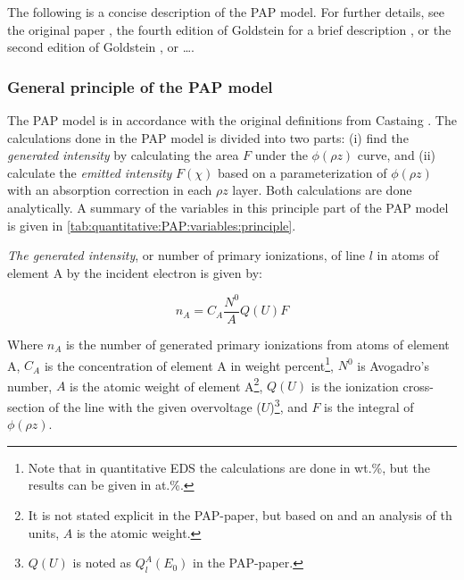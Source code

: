 The following is a concise description of the PAP model. 
For further details, see the original paper \cite{pap_1991}, the fourth edition of Goldstein for a brief description \cite{goldstein_scanning_2018}, or the second edition of Goldstein \cite{goldstein_2ed_1992}, or \dots {}.








\subsubsection{General principle of the PAP model}
\label{theory:quantitative:pap:general_principle}

The PAP model is in accordance with the original definitions from Castaing \cite{castaing_1951}.
The calculations done in the PAP model is divided into two parts: (i) find the \emph{generated intensity} by calculating the area $F$ under the $\phi(\rho z)$ curve, and (ii) calculate the \emph{emitted intensity} $F(\chi)$ based on a parameterization of $\phi(\rho z)$ with an absorption correction in each $\rho z$ layer.
Both calculations are done analytically.
A summary of the variables in this principle part of the PAP model is given in \cref{tab:quantitative:PAP:variables:principle}.


\emph{The generated intensity}, or number of primary ionizations, of line $l$ in atoms of element A by the incident electron is given by:

\begin{equation}
    \label{eq:theory:quantitative:pap:general_principle:n_a}
    n_A = C_A \frac{N^0}{A} Q(U) F
\end{equation}

Where $n_A$ is the number of generated primary ionizations from atoms of element A, $C_A$ is the concentration of element A in weight percent\footnote{Note that in quantitative EDS the calculations are done in wt.\%, but the results can be given in at.\%.}, $N^0$ is Avogadro's number, $A$ is the atomic weight of element A\footnote{It is not stated explicit in the PAP-paper, but based on \cite{love_scott_1990} and an analysis of th units, $A$ is the atomic weight.}, $Q(U)$ is the ionization cross-section of the line with the given overvoltage ($U$)\footnote{$Q(U)$ is noted as $Q_l^A(E_0)$ in the PAP-paper.}, and $F$ is the integral of $\phi(\rho z)$.

